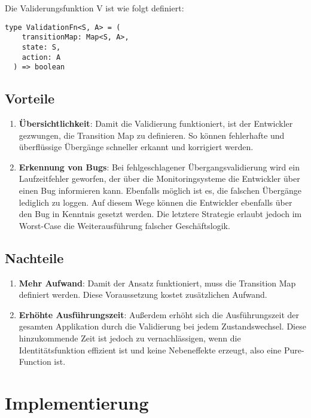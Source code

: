 Die Validerungsfunktion V ist wie folgt definiert:

\begin{lstlisting}
type ValidationFn<S, A> = (
    transitionMap: Map<S, A>,
    state: S,
    action: A
  ) => boolean
\end{lstlisting}

\subsection{Vorteile}

\begin{enumerate}
  \item \textbf{Übersichtlichkeit}: Damit die Validierung funktioniert, ist der Entwickler gezwungen, die Transition Map zu definieren. So können fehlerhafte und überflüssige Übergänge schneller erkannt und korrigiert werden.
  \item \textbf{Erkennung von Bugs}: Bei fehlgeschlagener Übergangsvalidierung wird ein Laufzeitfehler geworfen, der über die Monitoringsysteme die Entwickler über einen Bug informieren kann. Ebenfalls möglich ist es, die falschen Übergänge lediglich zu loggen. Auf diesem Wege können die Entwickler ebenfalls über den Bug in Kenntnis gesetzt werden. Die letztere Strategie erlaubt jedoch im Worst-Case die Weiterausführung falscher Geschäftslogik.
\end{enumerate}

\subsection{Nachteile}

\begin{enumerate}
  \item \textbf{Mehr Aufwand}: Damit der Ansatz funktioniert, muss die Transition Map definiert werden. Diese Voraussetzung kostet zusätzlichen Aufwand.
  \item \textbf{Erhöhte Ausführungszeit}: Außerdem erhöht sich die Ausführungszeit der gesamten Applikation durch die Validierung bei jedem Zustandswechsel. Diese hinzukommende Zeit ist jedoch zu vernachlässigen, wenn die Identitätsfunktion effizient ist und keine Nebeneffekte erzeugt, also eine Pure-Function ist.
\end{enumerate}

\section{Implementierung}

